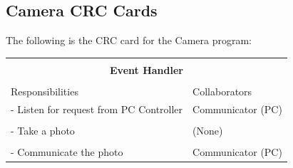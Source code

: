 \documentclass[titlepage]{article}
\begin{document}
\subsection{Camera CRC Cards}
The following is the CRC card for the Camera program:\\
\begin{table}[!htbp]
\centering
\begin{tabular}{| p{} | p{} |}\hline
	\multicolumn{2}{|l|}{}\\
	\multicolumn{2}{|c|}{\large{\textbf{Event Handler}}}\\
	\multicolumn{2}{|l|}{}\\\hline
	\vspace{0mm}\large{Responsibilities}\vspace{2mm} &\vspace{0mm}\large{Collaborators}\vspace{2mm}\\\hline
	\vspace{0mm}- Listen for request from PC Controller	&\vspace{0mm}Communicator (PC)\\&\\
	- Take a photo										&(None)\\&\\
	- Communicate the photo\vspace{2mm}					&Communicator (PC)\vspace{2mm}\\\hline
\end{tabular}
\end{table}
\newpage
\end{document}
